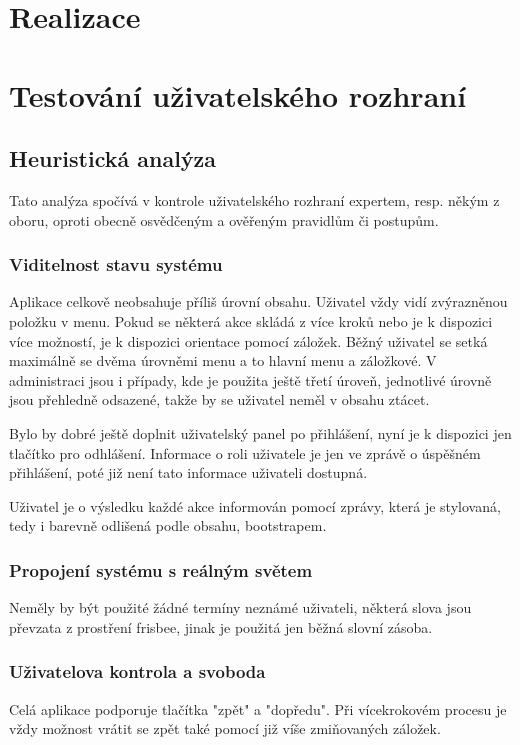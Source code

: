 \documentclass[thesis=B,czech]{FITthesis}[2012/06/26]
\begin{document}
\chapter{Realizace}

\chapter{Testování uživatelského rozhraní}
	
	\section{Heuristická analýza}
		Tato analýza spočívá v kontrole uživatelského rozhraní expertem, resp. někým z oboru, oproti obecně osvědčeným a ověřeným pravidlům či postupům. 

		\subsection{Viditelnost stavu systému}
			Aplikace celkově neobsahuje příliš úrovní obsahu. Uživatel vždy vidí zvýrazněnou položku v menu. Pokud se některá akce skládá z více kroků nebo je k dispozici více možností, je k dispozici orientace pomocí záložek. Běžný uživatel se setká maximálně se dvěma úrovněmi menu a to hlavní menu a záložkové. V administraci jsou i případy, kde je použita ještě třetí úroveň, jednotlivé úrovně jsou přehledně odsazené, takže by se uživatel neměl v obsahu ztácet.

			Bylo by dobré ještě doplnit uživatelský panel po přihlášení, nyní je k dispozici jen tlačítko pro odhlášení. Informace o roli uživatele je jen ve zprávě o úspěšném přihlášení, poté již není tato informace uživateli dostupná.

			Uživatel je o výsledku každé akce informován pomocí zprávy, která je stylovaná, tedy i barevně odlišená podle obsahu, bootstrapem.

		\subsection{Propojení systému s reálným světem}
			Neměly by být použité žádné termíny neznámé uživateli, některá slova jsou převzata z prostření frisbee, jinak je použitá jen běžná slovní zásoba.

		\subsection{Uživatelova kontrola a svoboda}
			Celá aplikace podporuje tlačítka "zpět" a "dopředu". Při vícekrokovém procesu je vždy možnost vrátit se zpět také pomocí již víše zmiňovaných záložek.
\end{document}
